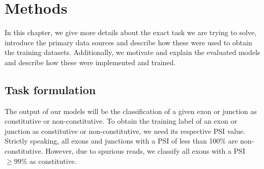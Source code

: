 \chapter{\label{ch:4-methods}Methods}




In this chapter, we give more details about the exact task we are trying to solve, introduce the primary data sources and describe how these were used to obtain the training datasets. Additionally, we motivate and explain the evaluated models and describe how these were implemented and trained.

%
%
%


\section{Task formulation} \label{sec:task_formulation}
The output of our models will be the classification of a given exon or junction as constitutive or non-constitutive. To obtain the training label of an exon or junction as constitutive or non-constitutive, we need its respective PSI value. 
Strictly speaking, all exons and junctions with a PSI of less than 100\% are non-constitutive. However, due to spurious reads, we classify all exons with a PSI $\geq 99\%$ as constitutive. 

